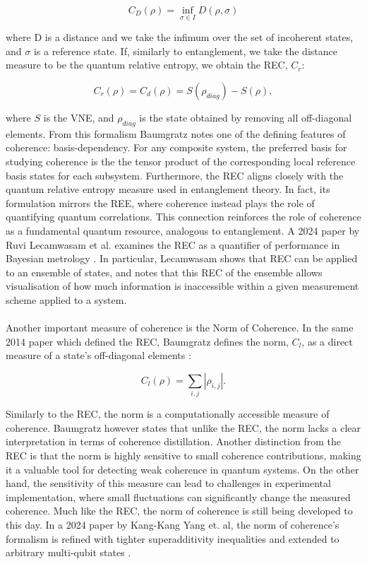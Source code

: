 \documentclass[12pt,a4paper]{article}
\begin{document}
\begin{equation}
    C_D(\rho) = \inf_{\sigma \in I} D(\rho,\sigma)
\end{equation}

where D is a distance and we take the infimum over the set of incoherent states, and $\sigma$ is a reference state. If, similarly to entanglement, we take the distance measure to be the quantum relative entropy, we obtain the REC, $C_r$:

\begin{equation}
    C_r(\rho) = C_d(\rho) = S(\rho_{diag}) - S(\rho),
\end{equation}

where $S$ is the VNE, and $\rho_{diag}$ is the state obtained by removing all off-diagonal elements. From this formalism Baumgratz notes one of the defining features of coherence: basis-dependency. For any composite system, the preferred basis for studying coherence is the the tensor product of the corresponding local reference basis states for each subsystem. Furthermore, the REC aligns closely with the quantum relative entropy measure used in entanglement theory. In fact, its formulation mirrors the REE, where coherence instead plays the role of quantifying quantum correlations. This connection reinforces the role of coherence as a fundamental quantum resource, analogous to entanglement. A 2024 paper by Ruvi Lecamwasam et al. examines the REC as a quantifier of performance in Bayesian metrology \cite{Coherence2024-REC_development}. In particular, Lecamwasam shows that REC can be applied to an ensemble of states, and notes that this REC of the ensemble allows visualisation of how much information is inaccessible within a given measurement scheme applied to a system. \\
\\
Another important measure of coherence is the Norm of Coherence. In the same 2014 paper which defined the REC, Baumgratz defines the norm, $C_l$, as a direct measure of a state's off-diagonal elements \cite{Coherence2014-seed}:

\begin{equation}
    C_l(\rho) = \sum_{i,j}|\rho_{i,j}|.
\end{equation}

Similarly to the REC, the norm is a computationally accessible measure of coherence. Baumgratz however states that unlike the REC, the norm lacks a clear interpretation in terms of coherence distillation. Another distinction from the REC is that the norm is highly sensitive to small coherence contributions, making it a valuable tool for detecting weak coherence in quantum systems. On the other hand, the sensitivity of this measure can lead to challenges in experimental implementation, where small fluctuations can significantly change the measured coherence. Much like the REC, the norm of coherence is still being developed to this day. In a 2024 paper by Kang-Kang Yang et. al, the norm of coherence's formalism is refined with tighter superadditivity inequalities and extended to arbitrary multi-qubit states \cite{Coherence2024-Norm_refinement}.
\end{document}

